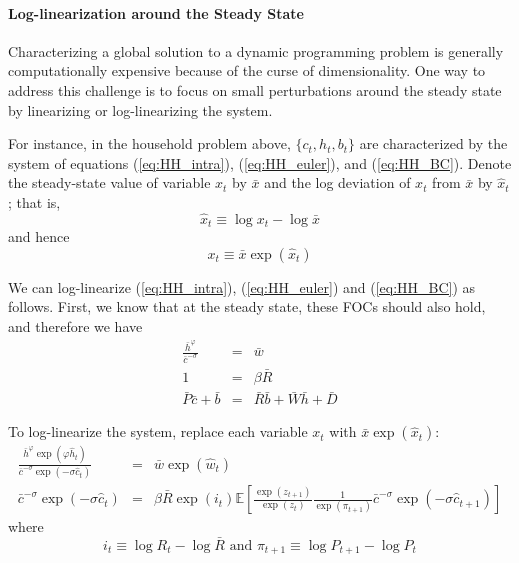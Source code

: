 \documentclass[12pt]{article}
\newcommand{\E}{\mathbb{E}}
\begin{document}
\paragraph{Log-linearization around the Steady State} Characterizing a global solution to a dynamic programming problem is generally computationally expensive because of the curse of dimensionality. One way to address this challenge is to focus on small perturbations around the steady state by linearizing or log-linearizing the system.

For instance, in the household problem above, $\{c_t, h_t, b_t\}$ are characterized by the system of equations (\ref{eq:HH_intra}), (\ref{eq:HH_euler}), and (\ref{eq:HH_BC}). Denote the steady-state value of variable $x_t$ by $\bar{x}$ and the log deviation of $x_t$ from $\bar{x}$ by $\hat{x}_t$; that is,
\[\hat{x}_t \equiv \log x_t - \log \bar{x}\]
and hence
\[x_t \equiv \bar{x} \exp(\hat{x}_t)\]

We can log-linearize (\ref{eq:HH_intra}), (\ref{eq:HH_euler}) and (\ref{eq:HH_BC}) as follows. First, we know that at the steady state, these FOCs should also hold, and therefore we have
\begin{eqnarray}
	\frac{\bar{h}^{\varphi}}{\bar{c}^{-\sigma}} &=& \bar{w} \\
	1 &=& \beta \bar{R} \\
	\bar{P} \bar{c} + \bar{b} &=& \bar{R} \bar{b} + \bar{W} \bar{h} + \bar{D}
\end{eqnarray}

To log-linearize the system, replace each variable $x_t$ with $\bar{x} \exp(\hat{x}_t)$:
\begin{eqnarray}
\frac{\bar{h}^\varphi \exp(\varphi \hat{h}_t)}{\bar{c}^{-\sigma} \exp(-\sigma \hat{c}_t)} &=& \bar{w} \exp(\hat{w}_t) \\
\bar{c}^{-\sigma} \exp(-\sigma \hat{c}_t) &=& \beta \bar{R} \exp(i_t) \E\left[\frac{\exp(z_{t+1})}{\exp(z_t)} \frac{1}{\exp(\pi_{t+1})}\bar{c}^{-\sigma} \exp(-\sigma \hat{c}_{t+1})\right] 
\end{eqnarray} 
where 
\[i_t \equiv \log R_t - \log \bar{R} \text{ and } \pi_{t+1} \equiv \log P_{t+1} - \log P_t \]
\end{document}

